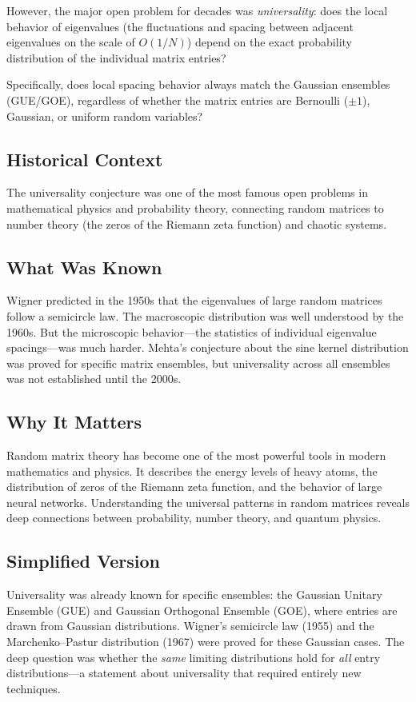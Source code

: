 However, the major open problem for decades was \emph{universality}: does the local behavior of eigenvalues (the fluctuations and spacing between adjacent eigenvalues on the scale of $O(1/N)$) depend on the exact probability distribution of the individual matrix entries?

Specifically, does local spacing behavior always match the Gaussian ensembles (GUE/GOE), regardless of whether the matrix entries are Bernoulli ($\pm 1$), Gaussian, or uniform random variables?

\subsection{Historical Context}
The universality conjecture was one of the most famous open problems in mathematical physics and probability theory, connecting random matrices to number theory (the zeros of the Riemann zeta function) and chaotic systems.

\subsection{What Was Known}
Wigner predicted in the 1950s that the eigenvalues of large random matrices follow a semicircle law. The macroscopic distribution was well understood by the 1960s. But the microscopic behavior---the statistics of individual eigenvalue spacings---was much harder. Mehta's conjecture about the sine kernel distribution was proved for specific matrix ensembles, but universality across all ensembles was not established until the 2000s.

\subsection{Why It Matters}
Random matrix theory has become one of the most powerful tools in modern mathematics and physics. It describes the energy levels of heavy atoms, the distribution of zeros of the Riemann zeta function, and the behavior of large neural networks. Understanding the universal patterns in random matrices reveals deep connections between probability, number theory, and quantum physics.

\subsection{Simplified Version}
Universality was already known for specific ensembles: the Gaussian Unitary Ensemble (GUE) and Gaussian Orthogonal Ensemble (GOE), where entries are drawn from Gaussian distributions. Wigner's semicircle law (1955) and the Marchenko--Pastur distribution (1967) were proved for these Gaussian cases. The deep question was whether the \emph{same} limiting distributions hold for \emph{all} entry distributions---a statement about universality that required entirely new techniques.

